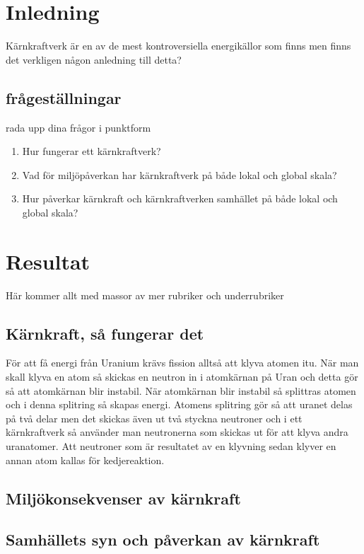 \documentclass[11p]{article}
\begin{document}
    \section{Inledning}
    Kärnkraftverk är en av de mest kontroversiella energikällor som finns men finns det verkligen någon anledning till detta?
    \subsection{frågeställningar}
    rada upp dina frågor i punktform
    \begin{enumerate}
        \item Hur fungerar ett kärnkraftverk?
        \item Vad för miljöpåverkan har kärnkraftverk på både lokal och global skala?
        \item Hur påverkar kärnkraft och kärnkraftverken samhället på både lokal och global skala?
    \end{enumerate}

    \section{Resultat}
    Här kommer allt med massor av mer rubriker och underrubriker
    \subsection{Kärnkraft, så fungerar det}
    För att få energi från Uranium krävs fission alltså att klyva atomen itu.
    När man skall klyva en atom så skickas en neutron in i atomkärnan på Uran och detta gör så att atomkärnan blir instabil.
    När atomkärnan blir instabil så splittras atomen och i denna splitring så skapas energi.
    Atomens splitring gör så att uranet delas på två delar men det skickas även ut två styckna neutroner och i ett kärnkraftverk så använder man neutronerna som skickas ut för att klyva andra uranatomer.
    Att neutroner som är resultatet av en klyvning sedan klyver en annan atom kallas för kedjereaktion.

    \subsection{Miljökonsekvenser av kärnkraft}
    \subsection{Samhällets syn och påverkan av kärnkraft}
    \subsection{}
\end{document}
